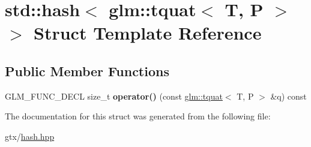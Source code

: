\hypertarget{structstd_1_1hash_3_01glm_1_1tquat_3_01T_00_01P_01_4_01_4}{\section{std\-:\-:hash$<$ glm\-:\-:tquat$<$ T, P $>$ $>$ Struct Template Reference}
\label{structstd_1_1hash_3_01glm_1_1tquat_3_01T_00_01P_01_4_01_4}
}
\subsection*{Public Member Functions}
\begin{DoxyCompactItemize}
\item 
\hypertarget{structstd_1_1hash_3_01glm_1_1tquat_3_01T_00_01P_01_4_01_4_aaa3bf5cebbe72e71800751539248443c}{G\-L\-M\-\_\-\-F\-U\-N\-C\-\_\-\-D\-E\-C\-L size\-\_\-t {\bfseries operator()} (const \hyperlink{structglm_1_1tquat}{glm\-::tquat}$<$ T, P $>$ \&q) const }\label{structstd_1_1hash_3_01glm_1_1tquat_3_01T_00_01P_01_4_01_4_aaa3bf5cebbe72e71800751539248443c}

\end{DoxyCompactItemize}


The documentation for this struct was generated from the following file\-:\begin{DoxyCompactItemize}
\item 
gtx/\hyperlink{hash_8hpp}{hash.\-hpp}\end{DoxyCompactItemize}
